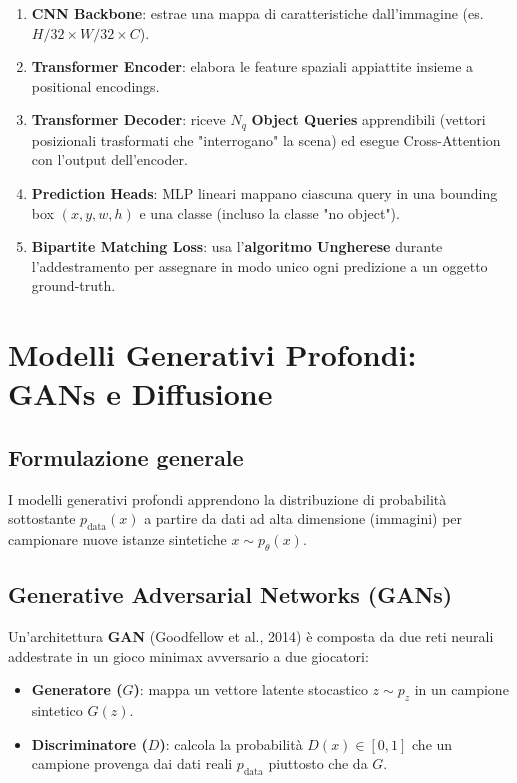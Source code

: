 \documentclass[12pt, a4paper]{report}
\begin{document}
\begin{defbox}
\begin{enumerate}
  \item \textbf{CNN Backbone}: estrae una mappa di caratteristiche dall'immagine
        (es.\ $H/32 \times W/32 \times C$).
  \item \textbf{Transformer Encoder}: elabora le feature spaziali appiattite insieme
        a positional encodings.
  \item \textbf{Transformer Decoder}: riceve $N_q$ \textbf{Object Queries} apprendibili
        (vettori posizionali trasformati che "interrogano" la scena) ed esegue
        Cross-Attention con l'output dell'encoder.
  \item \textbf{Prediction Heads}: MLP lineari mappano ciascuna query in una bounding
        box $(x, y, w, h)$ e una classe (incluso la classe "no object").
  \item \textbf{Bipartite Matching Loss}: usa l'\textbf{algoritmo Ungherese} durante
        l'addestramento per assegnare in modo unico ogni predizione a un oggetto
        ground-truth.
\end{enumerate}
\end{defbox}

\chapter{Modelli Generativi Profondi: GANs e Diffusione}

\section{Formulazione generale}

I modelli generativi profondi apprendono la distribuzione di probabilità sottostante
$p_{\text{data}}(x)$ a partire da dati ad alta dimensione (immagini) per campionare nuove
istanze sintetiche $x \sim p_{\theta}(x)$.

\section{Generative Adversarial Networks (GANs)}

Un'architettura \textbf{GAN} (Goodfellow et al., 2014) è composta da due reti neurali
addestrate in un gioco minimax avversario a due giocatori:
\begin{itemize}
  \item \textbf{Generatore ($G$)}: mappa un vettore latente stocastico $z \sim p_z$ in un
        campione sintetico $G(z)$.
  \item \textbf{Discriminatore ($D$)}: calcola la probabilità $D(x) \in [0, 1]$ che un
        campione provenga dai dati reali $p_{\text{data}}$ piuttosto che da $G$.
\end{itemize}
\end{document}

